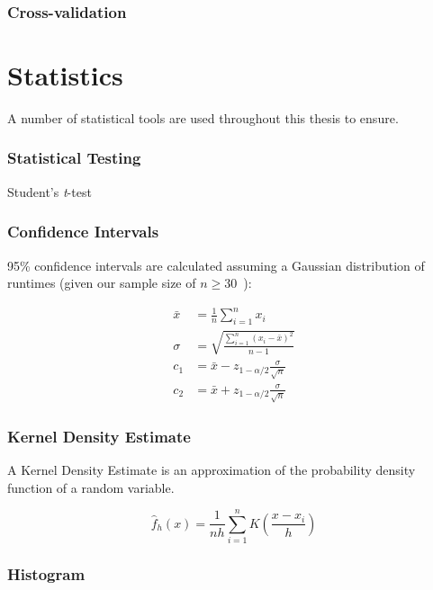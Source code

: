 \subsubsection{Cross-validation}


\section{Statistics}

A number of statistical tools are used throughout this thesis to
ensure.

\subsubsection{Statistical Testing}

Student's \emph{t}-test


\subsubsection{Confidence Intervals}

95\% confidence intervals are calculated assuming a Gaussian
distribution of runtimes (given our sample size of
$n \ge 30$~\cite{Georges2007}):

\begin{align}
\bar{x} &= \frac{1}{n}\sum_{i=1}^{n} x_i\\
\sigma &= \sqrt{\frac{\sum_{i=1}^{n}(x_i - \bar{x})^2}{n - 1}}\\
c_1 &= \bar{x} - z_{1-\alpha/2}\frac{\sigma}{\sqrt{n}}\\
c_2 &= \bar{x} + z_{1-\alpha/2}\frac{\sigma}{\sqrt{n}}
\end{align}


\subsubsection{Kernel Density Estimate}

A Kernel Density Estimate is an approximation of the probability
density function of a random variable.

\begin{equation}
  \hat{f}_h(x) = \frac{1}{nh} \sum^{n}_{i=1} K\left( \frac{x - x_i}{h} \right)
\end{equation}


\subsubsection{Histogram}

